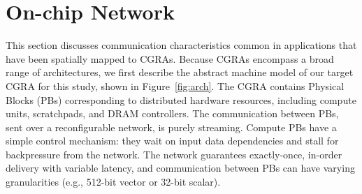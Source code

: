 \section{On-chip Network}

This section discusses communication characteristics common in
applications that have been spatially mapped to CGRAs. %
Because CGRAs encompass a broad range of architectures, we first describe the abstract machine model
of our target CGRA for this study, shown in  Figure~\ref{fig:arch}.
The CGRA contains Physical Blocks (PBs) corresponding to distributed hardware resources, including compute units, scratchpads, and DRAM controllers.
The communication between PBs, sent over a reconfigurable network, is purely streaming.
Compute PBs have a simple control mechanism: they wait on input data dependencies and stall for backpressure from the network. 
The network guarantees exactly-once, in-order delivery with variable latency, and communication between PBs can have varying granularities (e.g., 512-bit vector or 32-bit scalar).

